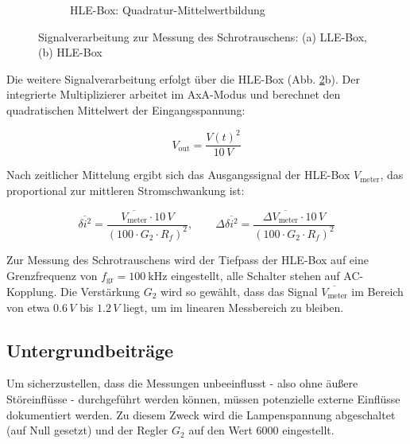 \begin{figure}[htbp]
\begin{subfigure}[t]{0.48\textwidth}
        \caption{HLE-Box: Quadratur-Mittelwertbildung}
        \label{fig:schrothle}
    \end{subfigure}
    \caption{Signalverarbeitung zur Messung des Schrotrauschens: (a) LLE-Box, (b) HLE-Box \cite{praktikum}}
    \label{fig:schrotboxes}
\end{figure}
\FloatBarrier

Die weitere Signalverarbeitung erfolgt über die HLE-Box  (Abb. \ref{fig:schrotboxes}b). 
Der integrierte Multiplizierer arbeitet im AxA-Modus und berechnet den quadratischen Mittelwert der Eingangsspannung:

\begin{equation}
    V_{\text{out}} = \frac{V(t)^2}{10 \, \si{V}}
\end{equation}

Nach zeitlicher Mittelung ergibt sich das Ausgangssignal der HLE-Box \( V_{\text{meter}} \), das proportional zur mittleren Stromschwankung ist:

\begin{equation}
    \overline{\delta i^2} = \frac{\overline{V_{\text{meter}}} \cdot 10 \, \si{V}}{(100 \cdot G_2 \cdot R_f)^2}, \qquad 
    \Delta\overline{\delta i^2} = \frac{\Delta \overline{V_{\text{meter}}} \cdot 10 \, \si{V}}{(100 \cdot G_2 \cdot R_f)^2}
\end{equation}

Zur Messung des Schrotrauschens wird der Tiefpass der HLE-Box auf eine Grenzfrequenz von \( f_{\text{gr}} = \SI{100}{\kilo\hertz} \) eingestellt, alle Schalter stehen auf AC-Kopplung. 
Die Verstärkung \( G_2 \) wird so gewählt, dass das Signal \( \overline{V_{\text{meter}}} \) im Bereich von etwa \( 0{.}6\,\si{V} \) bis \( 1{.}2\,\si{V} \) liegt, um im linearen Messbereich zu bleiben.

\subsection{Untergrundbeiträge}

Um sicherzustellen, dass die Messungen unbeeinflusst - also ohne äußere Störeinflüsse - durchgeführt werden können, müssen potenzielle externe Einflüsse dokumentiert werden. Zu diesem Zweck wird die Lampenspannung abgeschaltet (auf Null gesetzt) und der Regler \( G_2 \) auf den Wert 6000 eingestellt.

